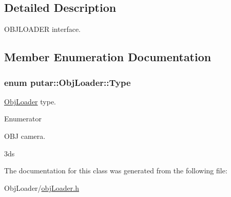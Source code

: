 \subsection{Detailed Description}
O\+B\+J\+L\+O\+A\+D\+ER interface. 

\subsection{Member Enumeration Documentation}
\subsubsection[{\texorpdfstring{Type}{Type}}]{\setlength{\rightskip}{0pt plus 5cm}enum {\bf putar\+::\+Obj\+Loader\+::\+Type}}\hypertarget{classputar_1_1ObjLoader_a4891ad8bb46a1414e2e9f202c1552e09}{}\label{classputar_1_1ObjLoader_a4891ad8bb46a1414e2e9f202c1552e09}


\hyperlink{classputar_1_1ObjLoader}{Obj\+Loader} type. 

\begin{Desc}
\item[Enumerator]\par
\begin{description}
\item[{\em 
T\+Y\+P\+E\+\_\+\+O\+BJ\hypertarget{classputar_1_1ObjLoader_a4891ad8bb46a1414e2e9f202c1552e09aa774f269e111384506b37b5409932f3f}{}\label{classputar_1_1ObjLoader_a4891ad8bb46a1414e2e9f202c1552e09aa774f269e111384506b37b5409932f3f}
}]O\+BJ camera. \item[{\em 
T\+Y\+P\+E\+\_\+3\+DS\hypertarget{classputar_1_1ObjLoader_a4891ad8bb46a1414e2e9f202c1552e09a484712937d79e778fdb8ee77a104087f}{}\label{classputar_1_1ObjLoader_a4891ad8bb46a1414e2e9f202c1552e09a484712937d79e778fdb8ee77a104087f}
}]3ds \end{description}
\end{Desc}


The documentation for this class was generated from the following file\+:\begin{DoxyCompactItemize}
\item 
Obj\+Loader/\hyperlink{objLoader_8h}{obj\+Loader.\+h}\end{DoxyCompactItemize}
